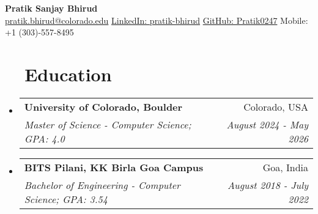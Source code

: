 \documentclass[letter,20pt]{article}
\makeatletter
\newcommand{\resumeSubheading}[4]{
  \vspace{-1pt}\item
    \begin{tabular*}{0.97\textwidth}{l@{\extracolsep{\fill}}r}
      \textbf{#1} & #2 \\
      \textit{#3} & \textit{#4} \\
    \end{tabular*}\vspace{-5pt}
}
\newcommand{\resumeSubHeadingListStart}{\begin{itemize}[leftmargin=*]}
\newcommand{\resumeSubHeadingListEnd}{\end{itemize}\vspace{-8pt}}
\makeatother
\begin{document}

\begin{center}
    \textbf{\LARGE Pratik Sanjay Bhirud} \\[0.1em] %
    \small
    \href{mailto:pratik.bhirud@colorado.edu}{pratik.bhirud@colorado.edu} \textbar{}
    \href{https://www.linkedin.com/in/pratik-bhirud/}{LinkedIn: pratik-bhirud} \textbar{}
    \href{https://github.com/Pratik0247}{GitHub: Pratik0247} \textbar{}
    Mobile: +1 (303)-557-8495
\end{center}

\vspace{-8pt}
\section{~~Education}
  \resumeSubHeadingListStart
      \resumeSubheading
      {University of Colorado, Boulder}{Colorado, USA}
      {Master of Science - Computer Science; GPA: 4.0}{August 2024 - May 2026}
      \vspace{-2pt}
    \resumeSubheading
      {BITS Pilani, KK Birla Goa Campus}{Goa, India}
      {Bachelor of Engineering - Computer Science;  GPA: 3.54}{August 2018 - July 2022}
      \vspace{-5pt}
    \resumeSubHeadingListEnd

\end{document}
